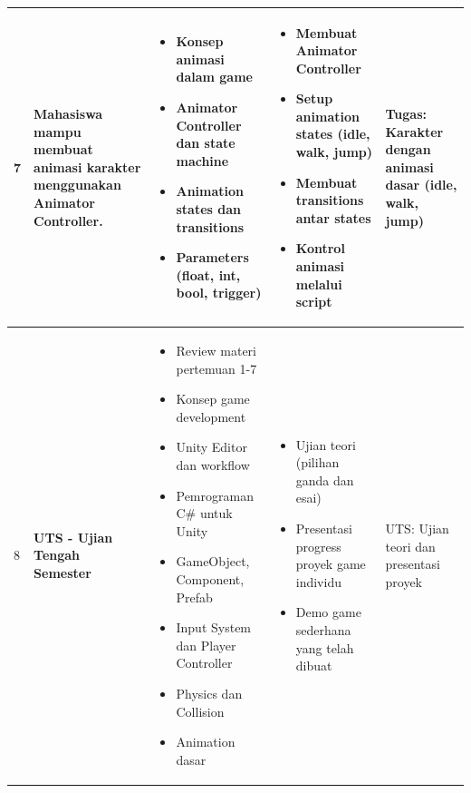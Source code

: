 \begin{longtable}{|p{0.8cm}|p{3.5cm}|p{4cm}|p{4cm}|p{2.5cm}|}
7 & Mahasiswa mampu membuat animasi karakter menggunakan Animator Controller. & 
\begin{itemize}[leftmargin=*,nosep]
\item Konsep animasi dalam game
\item Animator Controller dan state machine
\item Animation states dan transitions
\item Parameters (float, int, bool, trigger)
\end{itemize} & 
\begin{itemize}[leftmargin=*,nosep]
\item Membuat Animator Controller
\item Setup animation states (idle, walk, jump)
\item Membuat transitions antar states
\item Kontrol animasi melalui script
\end{itemize} & 
Tugas: Karakter dengan animasi dasar (idle, walk, jump) \\
\hline

8 & \textbf{UTS - Ujian Tengah Semester} & 
\begin{itemize}[leftmargin=*,nosep]
\item Review materi pertemuan 1-7
\item Konsep game development
\item Unity Editor dan workflow
\item Pemrograman C\# untuk Unity
\item GameObject, Component, Prefab
\item Input System dan Player Controller
\item Physics dan Collision
\item Animation dasar
\end{itemize} & 
\begin{itemize}[leftmargin=*,nosep]
\item Ujian teori (pilihan ganda dan esai)
\item Presentasi progress proyek game individu
\item Demo game sederhana yang telah dibuat
\end{itemize} & 
UTS: Ujian teori dan presentasi proyek \\
\hline


\end{longtable}
